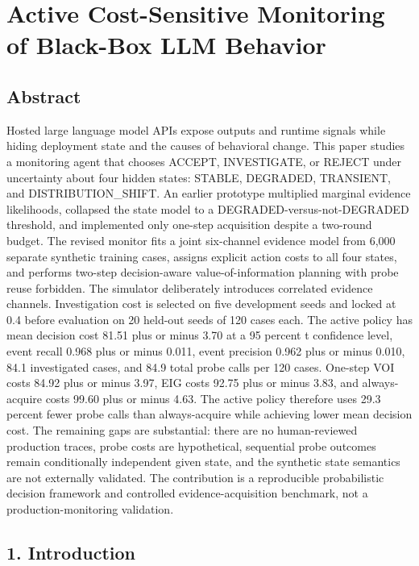 \documentclass[
]{article}
\author{}
\date{}
\begin{document}
\section{Active Cost-Sensitive Monitoring of Black-Box LLM Behavior}\label{active-cost-sensitive-monitoring-of-black-box-llm-behavior}

\subsection{Abstract}\label{abstract}

Hosted large language model APIs expose outputs and runtime signals while hiding deployment state and the causes of behavioral change. This paper studies a monitoring agent that chooses ACCEPT, INVESTIGATE, or REJECT under uncertainty about four hidden states: STABLE, DEGRADED, TRANSIENT, and DISTRIBUTION\_SHIFT. An earlier prototype multiplied marginal evidence likelihoods, collapsed the state model to a DEGRADED-versus-not-DEGRADED threshold, and implemented only one-step acquisition despite a two-round budget. The revised monitor fits a joint six-channel evidence model from 6,000 separate synthetic training cases, assigns explicit action costs to all four states, and performs two-step decision-aware value-of-information planning with probe reuse forbidden. The simulator deliberately introduces correlated evidence channels. Investigation cost is selected on five development seeds and locked at 0.4 before evaluation on 20 held-out seeds of 120 cases each. The active policy has mean decision cost 81.51 plus or minus 3.70 at a 95 percent t confidence level, event recall 0.968 plus or minus 0.011, event precision 0.962 plus or minus 0.010, 84.1 investigated cases, and 84.9 total probe calls per 120 cases. One-step VOI costs 84.92 plus or minus 3.97, EIG costs 92.75 plus or minus 3.83, and always-acquire costs 99.60 plus or minus 4.63. The active policy therefore uses 29.3 percent fewer probe calls than always-acquire while achieving lower mean decision cost. The remaining gaps are substantial: there are no human-reviewed production traces, probe costs are hypothetical, sequential probe outcomes remain conditionally independent given state, and the synthetic state semantics are not externally validated. The contribution is a reproducible probabilistic decision framework and controlled evidence-acquisition benchmark, not a production-monitoring validation.

\subsection{1. Introduction}\label{1-introduction}
\end{document}
